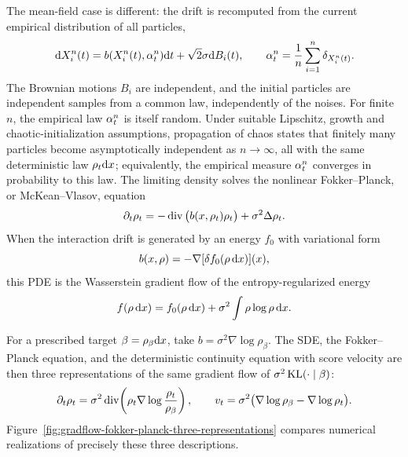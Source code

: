 The mean-field case is different: the drift is recomputed from the current empirical distribution of all particles,
\[
	\mathrm{d} X_i^n(t)=b(X_i^n(t),\alpha_t^n)\mathrm{d} t+\sqrt{2}\sigma\mathrm{d} B_i(t),
	\qquad
	\alpha_t^n=\frac1n\sum_{i=1}^n\delta_{X_i^n(t)}.
\]
The Brownian motions $B_i$ are independent, and the initial particles are independent samples from a common law, independently of the noises. For finite $n$, the empirical law $\alpha_t^n$ is itself random. Under suitable Lipschitz, growth and chaotic-initialization assumptions, propagation of chaos states that finitely many particles become asymptotically independent as $n\to\infty$, all with the same deterministic law $\rho_t\mathrm{d} x$; equivalently, the empirical measure $\alpha_t^n$ converges in probability to this law. The limiting density solves the nonlinear Fokker--Planck, or McKean--Vlasov, equation
\[
	\partial_t \rho_t
	=
	-\operatorname{div}\big(b(x,\rho_t)\rho_t\big)
	+
	\sigma^2\Delta\rho_t.
\]
When the interaction drift is generated by an energy $f_0$ with variational form
\[
	b(x,\rho)=-\nabla[\delta f_0(\rho\,\mathrm{d} x)](x),
\]
	this PDE is the Wasserstein gradient flow of the entropy-regularized energy
	\[
		f(\rho\,\mathrm{d} x)=f_0(\rho\,\mathrm{d} x)+\sigma^2\int \rho\log\rho\,\mathrm{d} x.
	\]

For a prescribed target $\beta=\rho_\beta\mathrm{d} x$, take $b=\sigma^2\nabla\log\rho_\beta$. The SDE, the Fokker--Planck equation, and the deterministic continuity equation with score velocity are then three representations of the same gradient flow of $\sigma^2\operatorname{KL}(\cdot\mid\beta)$:
\begin{equation}\label{eq-relative-entropy-three-representations}
	\partial_t\rho_t
	=
	\sigma^2\operatorname{div}\!\left(\rho_t\nabla\log\frac{\rho_t}{\rho_\beta}\right),
	\qquad
	v_t
	=
	\sigma^2\bigl(\nabla\log\rho_\beta-\nabla\log\rho_t\bigr).
\end{equation}
Figure~\ref{fig:gradflow-fokker-planck-three-representations} compares numerical realizations of precisely these three descriptions.

